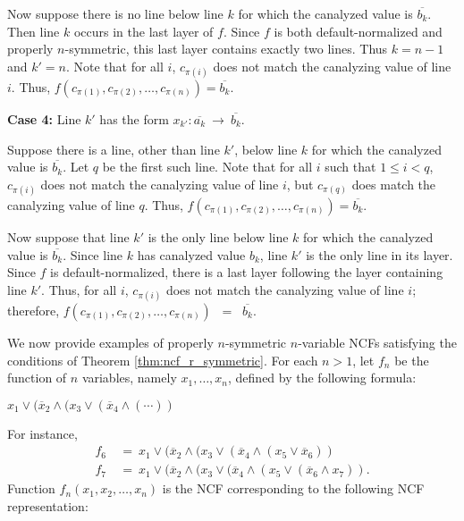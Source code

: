 Now suppose there is no line below line $k$ for which the canalyzed
value is $\overline{b_k}$.  
Then line $k$ occurs in the last layer of $f$.  
Since $f$ is both default-normalized and properly $n$-symmetric,
this last layer contains exactly two lines.  Thus $k = n-1$ and $k'
= n$.  Note that for all $i$, $c_{\pi(i)}$ does not match the
canalyzing value of line $i$.  Thus, $f(c_{\pi(1)}, c_{\pi(2)},
\ldots, c_{\pi(n)}) = \overline{b_k}$.

\medskip

\noindent
{\bf Case 4:} Line $k'$ has the form $x_{k'} : \overline{a_k} ~\longrightarrow~ 
              \overline{b_k}$. 

\smallskip

Suppose there is a line, other than line $k'$, below line $k$ for
which the canalyzed value is $\overline{b_k}$.  Let $q$ be the
first such line.  Note that for all $i$ such that $1 \leq i < q$,
$c_{\pi(i)}$ does not match the canalyzing value of line $i$, but
$c_{\pi(q)}$ does match the canalyzing value of line $q$.  Thus,
$f(c_{\pi(1)}, c_{\pi(2)}, \ldots, c_{\pi(n)}) = \overline{b_k}$.

Now suppose that line $k'$ is the only line below line $k$ for which
the canalyzed value is $\overline{b_k}$.  Since line $k$ has
canalyzed value $b_k$, line $k'$ is the only line in its layer.
Since $f$ is default-normalized, there is a last layer following the layer
containing line $k'$.  Thus, for all $i$, $c_{\pi(i)}$ does not
match the canalyzing value of line $i$; therefore, 
$f(c_{\pi(1)}, c_{\pi(2)}, \ldots, c_{\pi(n)})$ ~=~ $\overline{b_k}$.  \QED

\medskip

\noindent
We now provide
examples of properly $n$-symmetric $n$-variable NCFs satisfying the
conditions of Theorem \ref{thm:ncf_r_symmetric}.
For each $n > 1$, let $f_n$ be the function of $n$ variables, namely
$x_1, \ldots, x_n$, defined by the following formula:

\smallskip

\hspace*{0.5in} $x_1 \vee (\overline{x}_2 \wedge ( x_3 \vee (\overline{x}_4 \wedge (\cdots ))$

\smallskip

\noindent
For instance,
\begin{align*}
f_6 &~=~  x_1 \vee (\overline{x}_2 \wedge (x_3 \vee (\overline{x}_4 \wedge 
      (x_5 \vee \overline{x}_6)) \\
f_7 &~=~  x_1 \vee (\overline{x}_2 \wedge (x_3 \vee (\overline{x}_4 \wedge (x_5 
          \vee (\overline{x}_6 \wedge  x_7)).
\end{align*}
Function $f_n(x_1, x_2, \ldots, x_n)$ is the NCF corresponding to
the following NCF representation:

